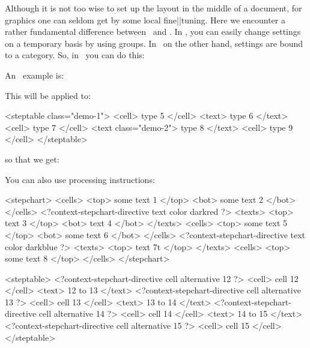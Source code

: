 Although it is not too wise to set up the layout in the middle of a document, for
graphics one can seldom get by some local fine||tuning. Here we encounter a
rather fundamental difference between \TEX\ and \XML. In \TEX, you can easily
change settings on a temporary basis by using groups. In \XML\ on the other hand,
settings are bound to a category. So, in \TEX\ you can do this:

\startbuffer
\setupSTEPcells
  [important]
  [color=darkgreen,
   style=bold]

\startSTEPchart
{}
 
 
 
  
\stopSTEPchart
\stopbuffer

\typebuffer \getbuffer

\noindentation An \XML\ example is:

\startbuffer
\setupSTEPcells[demo-1][alternative=5]
\setupSTEPcells[demo-1][framecolor=darkred]
\setupSTEPtexts[demo-1][framecolor=darkgreen]
\setupSTEPlines[demo-1][alternative=4]
\setupSTEPtexts[demo-2][style=bold]
\stopbuffer

\typebuffer \getbuffer

\noindentation This will be applied to:

\startbuffer
<steptable class="demo-1">
  <cell> type 5 </cell>
  <text> type 6 </text>
  <cell> type 7 </cell>
  <text class="demo-2"> type 8 </text>
  <cell> type 9 </cell>
</steptable>
\stopbuffer

\typebuffer

\noindentation so that we get:

\processxmlbuffer

You can also use processing instructions:

\startbuffer
<stepchart>
  <cells> <top> some text 1 </top> <bot> some text 2 </bot> </cells>
  <?context-stepchart-directive text color darkred ?>
  <texts> <top> text 3 </top> <bot> text 4 </bot> </texts>
  <cells> <top> some text 5 </top> <bot> some text 6 </bot> </cells>
  <?context-stepchart-directive text color darkblue ?>
  <texts> <top> text 7t </top> </texts>
  <cells> <top> some text 8 </top> </cells>
</stepchart>
\stopbuffer

\typebuffer \processxmlbuffer

\startbuffer
<steptable>
  <?context-stepchart-directive cell alternative 12 ?>
  <cell> cell 12 </cell> <text>  12 to 13 </text>
  <?context-stepchart-directive cell alternative 13 ?>
  <cell> cell 13 </cell> <text>  13 to 14 </text>
  <?context-stepchart-directive cell alternative 14 ?>
  <cell> cell 14 </cell> <text>  14 to 15 </text>
  <?context-stepchart-directive cell alternative 15 ?>
  <cell> cell 15 </cell>
</steptable>
\stopbuffer


